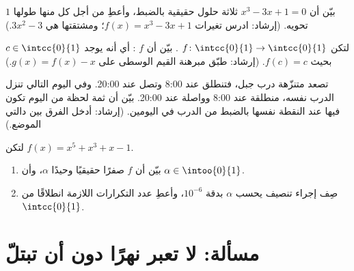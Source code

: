 \begin{exercise}[$\star\star$]\label{exo:g12:limcont:6}
بيّن أن  $x^3 - 3x + 1 = 0$ ثلاثة حلول حقيقية بالضبط،
وأعطِ من أجل كل منها  طولها $1$ تحويه.
(إرشاد: ادرس تغيرات $f(x) = x^3 - 3x + 1$؛ ومشتقتها هي
$3x^2 - 3$.)
\end{exercise}

\begin{exercise}[$\star\star$]\label{exo:g12:limcont:7}
لتكن $f \colon \intcc{0}{1} \to \intcc{0}{1}$ . بيّن أن  $f$
\emph{}: أي أنه يوجد $c \in \intcc{0}{1}$ بحيث $f(c) = c$.
(إرشاد: طبّق مبرهنة القيم الوسطى على $g(x) = f(x) - x$.)
\end{exercise}

\begin{exercise}[$\star\star\star$]\label{exo:g12:limcont:8}
تصعد متنزّهة درب جبل، فتنطلق عند 8:00 وتصل عند 20:00. وفي
اليوم التالي تنزل الدرب نفسه، منطلقة عند 8:00 وواصلة عند
20:00. بيّن أن ثمة لحظة من اليوم تكون فيها عند النقطة نفسها بالضبط
من الدرب في اليومين. (إرشاد: أدخل الفرق بين دالتي
الموضع.)
\end{exercise}

\begin{exercise}[$\star\star\star$]\label{exo:g12:limcont:9}
لتكن $f(x) = x^5 + x^3 + x - 1$.
\begin{enumerate}
  \item بيّن أن  $f$ صفرًا حقيقيًا وحيدًا $\alpha$، وأن
        $\alpha \in \intoo{0}{1}$.
  \item صِف إجراء تنصيف يحسب $\alpha$ بدقة
        $10^{-6}$، وأعطِ عدد التكرارات اللازمة انطلاقًا من
        $\intcc{0}{1}$.
\end{enumerate}
\end{exercise}

\section{مسألة: لا تعبر نهرًا دون أن تبتلّ}

